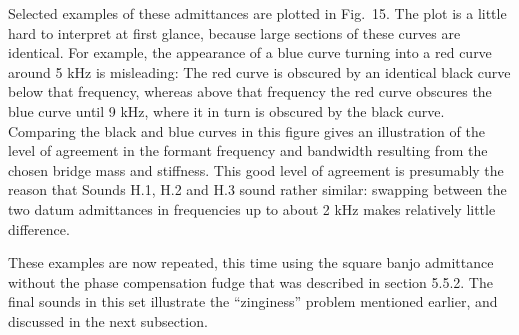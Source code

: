 




  Selected examples of these admittances are plotted in Fig.\ 15. The plot is 
  a little hard to interpret at first glance, because large sections of these 
  curves are identical. For example, the appearance of a blue curve turning 
  into a red curve around 5 kHz is misleading: The red curve is obscured by an 
  identical black curve below that frequency, whereas above that frequency the 
  red curve obscures the blue curve until 9 kHz, where it in turn is obscured 
  by the black curve. Comparing the black and blue curves in this figure gives 
  an illustration of the level of agreement in the formant frequency and 
  bandwidth resulting from the chosen bridge mass and stiffness. This good 
  level of agreement is presumably the reason that Sounds H.1, H.2 and H.3 
  sound rather similar: swapping between the two datum admittances in 
  frequencies up to about 2 kHz makes relatively little difference. 


  These examples are now repeated, this time using the square banjo admittance 
  without the phase compensation fudge that was described in section 5.5.2. The 
  final sounds in this set illustrate the ``zinginess'' problem mentioned 
  earlier, and discussed in the next subsection. 

